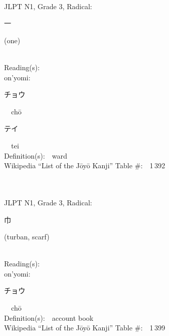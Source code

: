 \begin{multicols}{2}
{\fontsize{34pt}{40pt}  }\ \ \\  %
{JLPT N1, Grade 3, Radical:\ \ {\begin{CJK}{UTF8}{min} 一 \end{CJK}} (one) } \\
Reading(s):\ \ \\
{\hspace*{1em}}on'yomi:\ \ \\
{\hspace*{2em}}{\begin{CJK}{UTF8}{min} チョウ \end{CJK}}\ \ ch\=o\ \ \\
{\hspace*{2em}}{\begin{CJK}{UTF8}{min} テイ \end{CJK}}\ \ tei\ \ \\
Definition(s):\ \ ward \\
Wikipedia ``List of the J\=oy\=o Kanji'' Table \#:\ \ 1\,392 \\
\ \ \\
{\fontsize{34pt}{40pt}  }\ \ \\  %
{JLPT N1, Grade 3, Radical:\ \ {\begin{CJK}{UTF8}{min} 巾 \end{CJK}} (turban, scarf) } \\
Reading(s):\ \ \\
{\hspace*{1em}}on'yomi:\ \ \\
{\hspace*{2em}}{\begin{CJK}{UTF8}{min} チョウ \end{CJK}}\ \ ch\=o\ \ \\
Definition(s):\ \ account book \\
Wikipedia ``List of the J\=oy\=o Kanji'' Table \#:\ \ 1\,399 \\
\ \ \\
{\fontsize{34pt}{40pt}  }\ \ \\  %

\end{multicols}

